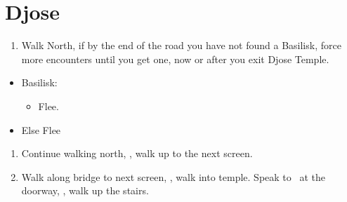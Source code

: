 \chapter{Djose}
\begin{enumerate}
    \item Walk North, if by the end of the road you have not found a Basilisk, force more encounters until you get one, now or after you exit Djose Temple.
\end{enumerate}
\begin{encounters}
    \begin{itemize}
        \item Basilisk:
        \begin{itemize}
            \kimahrif Lancet Basilisk, learn \textbf{Stone Breath}
            \item Flee.
        \end{itemize}
        \item Else Flee
    \end{itemize}
\end{encounters}
\begin{enumerate}[resume]
    \item Continue walking north, \sd, walk up to the next screen.
    \item Walk along bridge to next screen, \sd, walk into temple. Speak to \auron\ at the doorway, \sd, walk up the stairs.
\end{enumerate}
\bothvfill\winvfill\lossvfill
